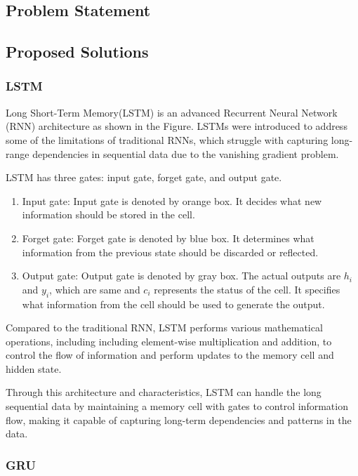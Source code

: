 \subsection{Problem Statement}



\subsection{Proposed Solutions}
\subsubsection{LSTM}
Long Short-Term Memory(LSTM) is an advanced Recurrent Neural Network (RNN) architecture 
as shown in the Figure. 
LSTMs were introduced to address some of the limitations of traditional RNNs, 
which struggle with capturing long-range dependencies in sequential data due to the vanishing gradient problem.

LSTM has three gates: input gate, forget gate, and output gate.
\begin{enumerate}
	\item Input gate: 	Input gate is denoted by orange box. It decides what new information should be stored in the cell.
	\item Forget gate:	Forget gate is denoted by blue box. It determines what information from the previous state should be discarded or reflected.
	\item Output gate:	Output gate is denoted by gray box. The actual outputs are $h_{i}$ and $y_{i}$, which are same and $c_{i}$ represents the status of the cell. It specifies what information from the cell should be used to generate the output.
\end{enumerate}

Compared to the traditional RNN, LSTM performs various mathematical operations, including including element-wise multiplication and addition, to control the flow of information and perform updates to the memory cell and hidden state.

Through this architecture and characteristics, LSTM can handle the long sequential data by maintaining a memory cell with gates to control information flow, 
making it capable of capturing long-term dependencies and patterns in the data.

\subsubsection{GRU}

